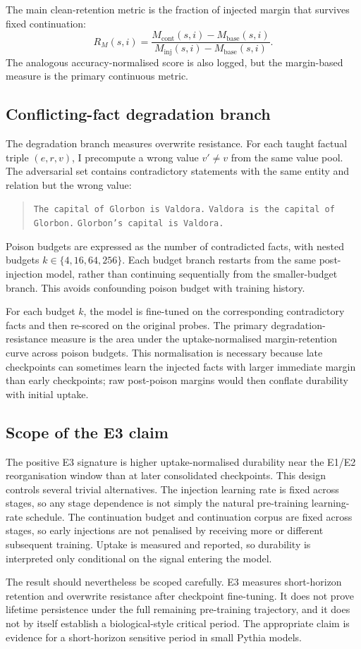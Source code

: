 The main clean-retention metric is the fraction of injected margin that survives fixed continuation:
\[
R_M(s,i) =
\frac{M_{\mathrm{cont}}(s,i)-M_{\mathrm{base}}(s,i)}
     {M_{\mathrm{inj}}(s,i)-M_{\mathrm{base}}(s,i)}.
\]
The analogous accuracy-normalised score is also logged, but the margin-based measure is the primary continuous metric.

\subsection{Conflicting-fact degradation branch}
\label{sec:method-e3-degradation}

The degradation branch measures overwrite resistance.  For each taught factual triple $(e,r,v)$, I precompute a wrong value $v' \neq v$ from the same value pool.  The adversarial set contains contradictory statements with the same entity and relation but the wrong value:
\begin{quote}
\texttt{The capital of Glorbon is Valdora.}\quad
\texttt{Valdora is the capital of Glorbon.}\quad
\texttt{Glorbon's capital is Valdora.}
\end{quote}
Poison budgets are expressed as the number of contradicted facts, with nested budgets $k\in\{4,16,64,256\}$.  Each budget branch restarts from the same post-injection model, rather than continuing sequentially from the smaller-budget branch.  This avoids confounding poison budget with training history.

For each budget $k$, the model is fine-tuned on the corresponding contradictory facts and then re-scored on the original probes.  The primary degradation-resistance measure is the area under the uptake-normalised margin-retention curve across poison budgets.  This normalisation is necessary because late checkpoints can sometimes learn the injected facts with larger immediate margin than early checkpoints; raw post-poison margins would then conflate durability with initial uptake.

\subsection{Scope of the E3 claim}
\label{sec:method-e3-scope}

The positive E3 signature is higher uptake-normalised durability near the E1/E2 reorganisation window than at later consolidated checkpoints.  This design controls several trivial alternatives.  The injection learning rate is fixed across stages, so any stage dependence is not simply the natural pre-training learning-rate schedule.  The continuation budget and continuation corpus are fixed across stages, so early injections are not penalised by receiving more or different subsequent training.  Uptake is measured and reported, so durability is interpreted only conditional on the signal entering the model.

The result should nevertheless be scoped carefully.  E3 measures short-horizon retention and overwrite resistance after checkpoint fine-tuning.  It does not prove lifetime persistence under the full remaining pre-training trajectory, and it does not by itself establish a biological-style critical period.  The appropriate claim is evidence for a short-horizon sensitive period in small Pythia models.
